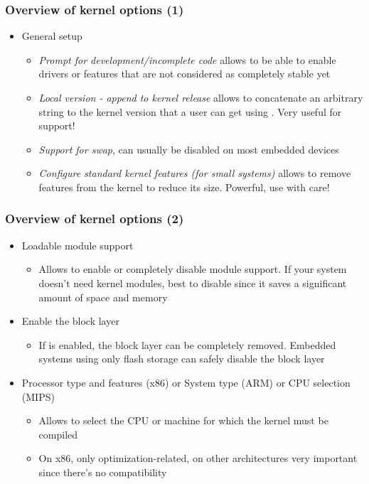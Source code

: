 \begin{frame}
  \frametitle{Overview of kernel options (1)}
  \begin{itemize}
  \item General setup
    \begin{itemize}
    \item {\em Prompt for development/incomplete code} allows to be
      able to enable drivers or features that are not considered as
      completely stable yet
    \item {\em Local version - append to kernel release} allows to
      concatenate an arbitrary string to the kernel version that a
      user can get using . Very useful for support!
    \item {\em Support for swap}, can usually be disabled on most
      embedded devices
    \item {\em Configure standard kernel features (for small systems)}
      allows to remove features from the kernel to reduce its
      size. Powerful, use with care!
    \end{itemize}
  \end{itemize}
\end{frame}

\begin{frame}
  \frametitle{Overview of kernel options (2)}
  \begin{itemize}
  \item Loadable module support
    \begin{itemize}
    \item Allows to enable or completely disable module support. If
      your system doesn't need kernel modules, best to disable since
      it saves a significant amount of space and memory
    \end{itemize}
  \item Enable the block layer
    \begin{itemize}
    \item If  is enabled, the block layer can be
      completely removed. Embedded systems using only flash storage
      can safely disable the block layer
    \end{itemize}
  \item Processor type and features (x86) or System type (ARM) or CPU selection
    (MIPS)
    \begin{itemize}
    \item Allows to select the CPU or machine for which the kernel
      must be compiled
    \item On x86, only optimization-related, on other architectures
      very important since there's no compatibility
    \end{itemize}
  \end{itemize}
\end{frame}

